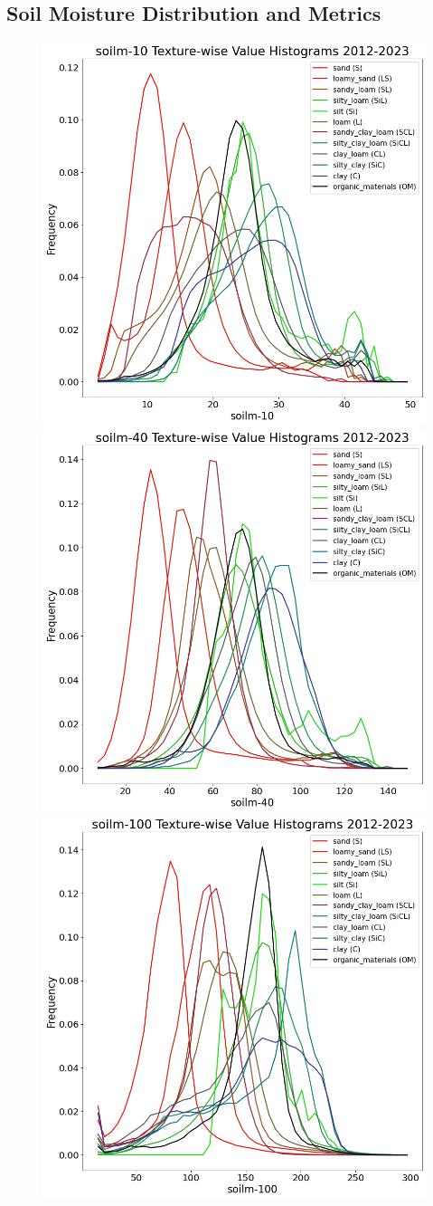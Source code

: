\subsection{Soil Moisture Distribution and Metrics}

\begin{figure}[h!]
    \centering
    \includegraphics[width=.32\linewidth]{figures/thesis-gridstats/gridstat-hist-textures_soilm-10_2012-1_2023-12_y000-195_x000-462}
    \includegraphics[width=.32\linewidth]{figures/thesis-gridstats/gridstat-hist-textures_soilm-40_2012-1_2023-12_y000-195_x000-462}
    \includegraphics[width=.32\linewidth]{figures/thesis-gridstats/gridstat-hist-textures_soilm-100_2012-1_2023-12_y000-195_x000-462}


\end{figure}
